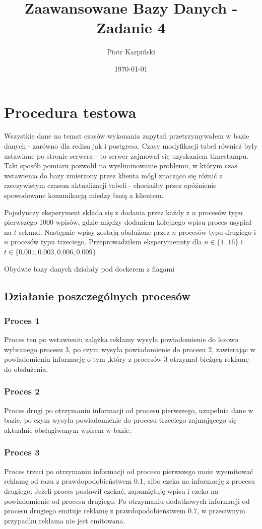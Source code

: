 \documentclass[polish, 10pt]{article}
\author{Piotr Karpiński}
\date{\today}
\title{Zaawansowane Bazy Danych - Zadanie 4}
\begin{document}
\maketitle

\section{Procedura testowa}
Wszystkie dane na temat czasów wykonania zapytań przetrzymywałem w bazie danych - zarówno dla redisa jak i postgresa.  Czasy modyfikacji tabel również były ustawiane po stronie serwera - to serwer zajmował się uzyskaniem timestampu. Taki sposób pomiaru pozwolił na wyeliminowanie problemu, w którym czas wstawienia do bazy zmierzony przez klienta mógł znacząco się różnić z rzeczywistym czasem aktualizacji tabeli - chociażby przez opóźnienie spowodowane komunikacją miedzy bazą a klientem.

Pojedynczy eksperyment składa się z dodania przez każdy z $n$ procesów typu pierwszego 1000 wpisów, gdzie między dodaniem kolejnego wpisu proces usypiał na $t$ sekund. Następnie wpisy zostają obsłużone przez $n$ procesów typu drugiego i $n$ procesów typu trzeciego. Przeprowadziłem eksperymennty dla $n \in \{1..16\}$ i $t \in \{0.001, 0.003, 0.006, 0.009\}$.

Obydwie bazy danych działały pod dockerem z flagami 



\subsection{Działanie poszczególnych procesów}
\subsubsection{Proces 1}
Proces ten po wstawieniu zalążka reklamy wysyła powiadomienie do losowo wybranego procesu 3, po czym wysyła powiadomienie do procesu 2, zawierając w powiadomieniu informację o tym ,który z procesów 3 otrzymał bieżącą reklamę do obsłużenia.

\subsubsection{Proces 2}
Proces drugi po otrzymaniu informacji od procesu pierwszego, uzupełnia dane w bazie, po czym wysyła powiadomienie do procesu trzeciego zajmującego się aktualnie obsługiwanym wpisem w bazie.

\subsubsection{Proces 3}
Proces trzeci po otrzymaniu informacji od procesu pierwszego może wyemitować reklamę od razu z prawdopodobieństwem 0.1, albo czeka na informację z procesu drugiego. Jeżeli proces postawił czekać, zapamiętuję  wpisu i czeka na powiadomienie od procesu drugiego. Po otrzymaniu dodatkowych informacji od procesu drugiego emituje reklamę z prawdopodobieństwem 0.7, w przeciwnym przypadku reklama nie jest emitowana.
\end{document}
